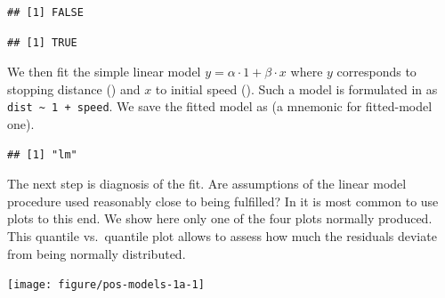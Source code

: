 \documentclass[krantz2]{krantz}\usepackage{knitr}%
\begin{document}
\begin{knitrout}\footnotesize
{}\color{fgcolor}\begin{kframe}
\begin{alltt}
\hlopt{$}
\end{alltt}
\begin{verbatim}
## [1] FALSE
\end{verbatim}
\begin{alltt}
\hlopt{$}
\end{alltt}
\begin{verbatim}
## [1] TRUE
\end{verbatim}
\end{kframe}
\end{knitrout}

We then fit the simple linear model $y = \alpha \cdot 1 + \beta \cdot x$ where $y$ corresponds to stopping distance () and $x$ to initial speed (). Such a model is formulated in \Rlang as \verb|dist ~ 1 + speed|. We save the fitted model as  (a mnemonic for fitted-model one).

\begin{knitrout}\footnotesize
{}\color{fgcolor}\begin{kframe}
\begin{alltt}
 \hlkwb{<-}  \hlopt{~}  \hlopt{+}  
\end{alltt}
\begin{verbatim}
## [1] "lm"
\end{verbatim}
\end{kframe}
\end{knitrout}

The next step is diagnosis of the fit. Are assumptions of the linear model procedure used reasonably close to being fulfilled? In \Rlang it is most common to use plots to this end. We show here only one of the four plots normally produced. This quantile vs.\ quantile plot allows to assess how much the residuals deviate from being normally distributed.

\begin{knitrout}\footnotesize
{}\color{fgcolor}\begin{kframe}
\begin{alltt}
  \hlstd{=} \hlstd{)}
\end{alltt}
\end{kframe}

{\centering \texttt{[image: figure/pos-models-1a-1]} 

}



\end{knitrout}
\end{document}
